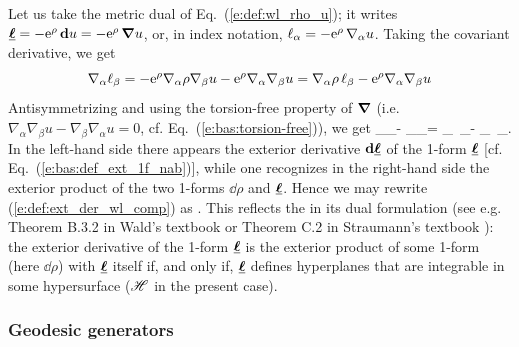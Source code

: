 Let us take the metric dual of Eq.~(\ref{e:def:wl_rho_u}); it writes
$\underline{\bm{\ell}} = - \mathrm{e}^\rho \, \mathbf{d} u = - \mathrm{e}^\rho \, \bm{\nabla} u $, or, in index notation,
$\ell_\alpha = - \mathrm{e}^\rho \, \nabla_\alpha u$.
Taking the covariant derivative, we get
\[
    \nabla_\alpha \ell_\beta = - \mathrm{e}^\rho \nabla_\alpha \rho \nabla_\beta u
                -   \mathrm{e}^\rho  \nabla_\alpha \nabla_\beta u
                 = \nabla_\alpha \rho \, \ell_\beta - \mathrm{e}^\rho  \nabla_\alpha \nabla_\beta u
\]
Antisymmetrizing and using the torsion-free property of $\bm{\nabla}$ (i.e.
$\nabla_\alpha \nabla_\beta u - \nabla_\beta \nabla_\alpha u = 0$, cf.
Eq.~(\ref{e:bas:torsion-free})), we get
\be \label{e:def:ext_der_wl_comp}
  \nabla_\alpha \el_\beta - \nabla_\beta \el_\alpha =
  \nabla_\alpha \rho \, \el_\beta -  \nabla_\beta \rho \, \el_\alpha  .
\ee
In the left-hand side there appears the exterior derivative $\mathbf{d}\underline{\bm{\ell}}$ of
the 1-form $\underline{\bm{\ell}}$ [cf. Eq.~(\ref{e:bas:def_ext_1f_nab})],
while one recognizes in the right-hand side the exterior product  of
the two 1-forms $\dd\rho$ and $\underline{\bm{\ell}}$. Hence we may rewrite (\ref{e:def:ext_der_wl_comp})
as
\be
    \encadre{ \dd \uu{\el} = \dd\rho \wedge \uu{\el} } .
\ee
This reflects the 
in its dual formulation (see e.g.
Theorem B.3.2 in Wald's textbook \cite{Wald84} or Theorem C.2 in
Straumann's textbook \cite{Strau13}):
the exterior derivative of
the 1-form $\underline{\bm{\ell}}$ is the exterior product of
some 1-form (here $\dd\rho$) with $\underline{\bm{\ell}}$ itself if, and only if,
$\underline{\bm{\ell}}$ defines hyperplanes that are integrable in some hypersurface ($\mathscr{H}$ in the present case).

\subsubsection{Geodesic generators} \label{s:def:geod_gener}

